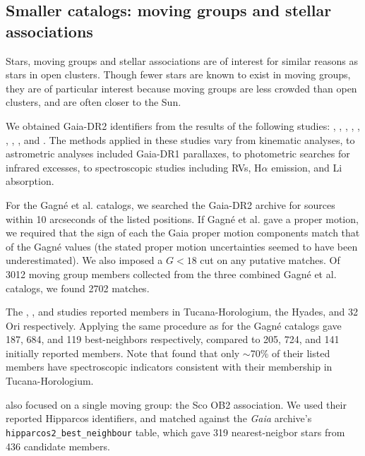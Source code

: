\documentclass[12pt,twocolumn,tighten]{aastex62}
\begin{document}
\subsection{Smaller catalogs: moving groups and stellar associations}
\label{subsec:mg}

Stars, moving groups and stellar associations are of interest for
similar reasons as stars in open clusters.  Though fewer stars
are known to exist in moving groups, they are of particular interest
because moving groups are less crowded than open clusters, and are
often closer to the Sun.

We obtained Gaia-DR2 identifiers from the results of the following
studies:
\citet{gagne_banyan_XI_2018},
\citet{gagne_banyan_XII_2018},
\citet{gagne_banyan_XIII_2018},
\citet{kraus_tucanahor_2014},
\citet{roser_deep_2011}, %
\citet{bell_32ori_2017},
\citet{rizzuto_multidimensional_2011},
\citet{oh_comoving_2017}, and
\citet{zari_3d_2018}. The methods applied in these studies
vary from kinematic analyses, to astrometric analyses included
Gaia-DR1 parallaxes, to photometric searches for infrared excesses, to
spectroscopic studies including RVs, H$\alpha$
emission, and Li absorption.

For the Gagn\'e et al{.} catalogs, we searched the Gaia-DR2 archive for
sources within 10 arcseconds of the listed positions.  If Gagn\'e et
al{.} gave a proper motion, we required that the sign of each the Gaia
proper motion components match that of the Gagn\'e values (the stated
proper motion uncertainties seemed to have been underestimated).  We
also imposed a $G<18$ cut on any putative matches.  Of 3012 moving
group members collected from the three combined Gagn\'e et al{.}
catalogs, we found 2702 matches.

The \citet{kraus_tucanahor_2014}, \citet{roser_deep_2011}, and
\citet{bell_32ori_2017} studies reported members in Tucana-Horologium,
the Hyades, and 32$\,$Ori respectively.  Applying the same procedure as
for the Gagn\'e catalogs gave 187, 684, and 119 best-neighbors
respectively, compared to 205, 724, and 141 initially reported
members.  Note that \citet{kraus_tucanahor_2014} found that only
$\sim$70\% of their listed members have spectroscopic indicators
consistent with their membership in Tucana-Horologium.

\citet{rizzuto_multidimensional_2011} also focused on a single moving
group: the Sco OB2 association. We used their reported Hipparcos
identifiers, and matched against the {\it Gaia} archive's
\texttt{hipparcos2\_best\_neighbour} table, which gave 319
nearest-neigbor stars from 436 candidate members.
\end{document}
